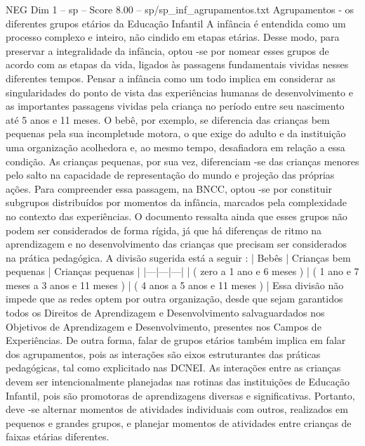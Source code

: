 \begin{textsample}{NEG Dim 1 – sp – Score 8.00 – sp/sp\_inf\_agrupamentos.txt}  \label{ex:f1_neg_179}
Agrupamentos - os diferentes grupos etários da Educação Infantil A infância é entendida como um processo complexo e inteiro, não cindido em etapas etárias.
Desse modo, para preservar a integralidade da infância, optou -se por nomear esses grupos de acordo com as etapas da vida, ligados às passagens fundamentais vividas nesses diferentes tempos.
Pensar a infância como um todo implica em considerar as singularidades do ponto de vista das experiências humanas de desenvolvimento e as importantes passagens vividas pela criança no período entre seu nascimento até 5 anos e 11 meses.
O bebê, por exemplo, se diferencia das crianças bem pequenas pela sua incompletude motora, o que exige do adulto e da instituição uma organização acolhedora e, ao mesmo tempo, desafiadora em relação a essa condição.
As crianças pequenas, por sua vez, diferenciam -se das crianças menores pelo salto na capacidade de representação do mundo e projeção das próprias ações.
Para compreender essa passagem, na BNCC, optou -se por constituir subgrupos distribuídos por momentos da infância, marcados pela complexidade no contexto das experiências.
O documento ressalta ainda que esses grupos não podem ser considerados de forma rígida, já que há diferenças de ritmo na aprendizagem e no desenvolvimento das crianças que precisam ser considerados na prática pedagógica.
A divisão sugerida está a seguir : | Bebês | Crianças bem pequenas | Crianças pequenas | |---|---|---| | ( zero a 1 ano e 6 meses ) | ( 1 ano e 7 meses a 3 anos e 11 meses ) | ( 4 anos a 5 anos e 11 meses ) | Essa divisão não impede que as redes optem por outra organização, desde que sejam garantidos todos os Direitos de Aprendizagem e Desenvolvimento salvaguardados nos Objetivos de Aprendizagem e Desenvolvimento, presentes nos Campos de Experiências.
De outra forma, falar de grupos etários também implica em falar dos agrupamentos, pois as interações são eixos estruturantes das práticas pedagógicas, tal como explicitado nas DCNEI.
As interações entre as crianças devem ser intencionalmente planejadas nas rotinas das instituições de Educação Infantil, pois são promotoras de aprendizagens diversas e significativas.
Portanto, deve -se alternar momentos de atividades individuais com outros, realizados em pequenos e grandes grupos, e planejar momentos de atividades entre crianças de faixas etárias diferentes.

\end{textsample}
